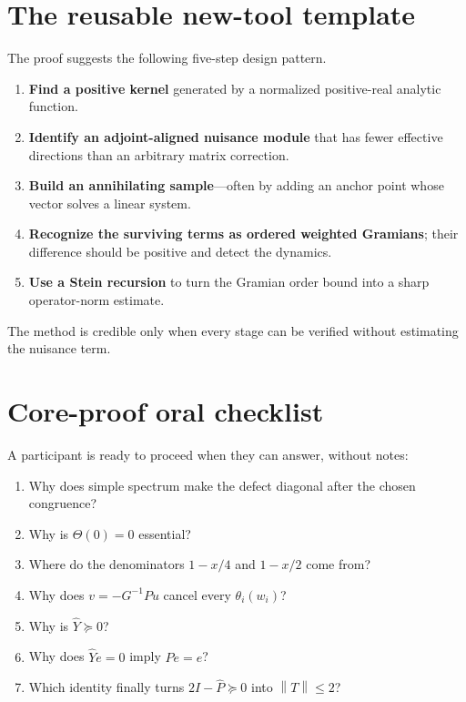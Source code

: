 \documentclass[11pt,oneside,openany]{book}
\theoremstyle{definition}
\theoremstyle{remark}
\newcommand{\norm}[1]{\left\lVert #1\right\rVert}
\begin{document}
\section{The reusable new-tool template}

The proof suggests the following five-step design pattern.
\begin{proofmap}
\begin{enumerate}
  \item \textbf{Find a positive kernel} generated by a normalized
  positive-real analytic function.
  \item \textbf{Identify an adjoint-aligned nuisance module} that has
  fewer effective directions than an arbitrary matrix correction.
  \item \textbf{Build an annihilating sample}---often by adding an
  anchor point whose vector solves a linear system.
  \item \textbf{Recognize the surviving terms as ordered weighted
  Gramians}; their difference should be positive and detect the
  dynamics.
  \item \textbf{Use a Stein recursion} to turn the Gramian order bound
  into a sharp operator-norm estimate.
\end{enumerate}
\end{proofmap}
The method is credible only when every stage can be verified without
estimating the nuisance term.

\section{Core-proof oral checklist}

A participant is ready to proceed when they can answer, without notes:
\begin{enumerate}
  \item Why does simple spectrum make the defect diagonal after the
  chosen congruence?
  \item Why is \(\Theta(0)=0\) essential?
  \item Where do the denominators \(1-x/4\) and \(1-x/2\) come from?
  \item Why does \(v=-G^{-1}Pu\) cancel every \(\theta_i(w_i)\)?
  \item Why is \(\widehat Y\succeq0\)?
  \item Why does \(\widehat Ye=0\) imply
  \(\widehat Pe=e\)?
  \item Which identity finally turns \(2I-\widehat P\succeq0\) into
  \(\norm{T}\leq2\)?
\end{enumerate}
\end{document}
